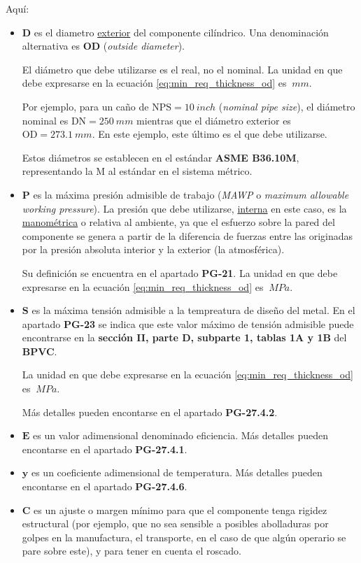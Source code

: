 Aquí:
\begin{itemize}
     \item $\mathbf{D}$ es el diametro \underline{exterior} del componente cilíndrico. Una denominación alternativa es $\mathbf{OD}$ (\textit{outside diameter}). 
     
     El diámetro que debe utilizarse es el real, no el nominal. La unidad en que debe expresarse en la ecuación \ref{eq:min_req_thickness_od} es $\SI{}{mm}$.
     
     Por ejemplo, para un caño de $\text{NPS}=\SI{10}{inch}$ (\textit{nominal pipe size}), el diámetro nominal es $\text{DN}=\SI{250}{mm}$ mientras que el diámetro exterior es $\text{OD}=\SI{273,1}{mm}$. En este ejemplo, este último es el que debe utilizarse.

     Estos diámetros se establecen en el estándar \textbf{ASME B36.10M}, representando la M al estándar en el sistema métrico.

     \item $\mathbf{P}$ es la máxima presión admisible de trabajo (\textit{MAWP} o \textit{maximum allowable working pressure}). La presión que debe utilizarse, \underline{interna} en este caso, es la \underline{manométrica} o relativa al ambiente, ya que el esfuerzo sobre la pared del componente se genera a partir de la diferencia de fuerzas entre las originadas por la presión absoluta interior y la exterior (la atmosférica).
     
     Su definición se encuentra en el apartado \textbf{PG-21}. La unidad en que debe expresarse en la ecuación \ref{eq:min_req_thickness_od} es $\SI{}{MPa}$.   

     \item $\mathbf{S}$ es la máxima tensión admisible a la tempreatura de diseño del metal. En el apartado \textbf{PG-23} se indica que este valor máximo de tensión admisible puede encontrarse en la \textbf{sección II, parte D, subparte 1, tablas 1A y 1B} del \textbf{BPVC}.
     
     La unidad en que debe expresarse en la ecuación \ref{eq:min_req_thickness_od} es $\SI{}{MPa}$.

     Más detalles pueden encontarse en el apartado \textbf{PG-27.4.2}.

     \item $\mathbf{E}$ es un valor adimensional denominado eficiencia. Más detalles pueden encontarse en el apartado \textbf{PG-27.4.1}.
     \item $\mathbf{y}$ es un coeficiente adimensional de temperatura. Más detalles pueden encontarse en el apartado \textbf{PG-27.4.6}.
     \item $\mathbf{C}$ es un ajuste o margen mínimo para que el componente tenga rigidez estructural (por ejemplo, que no sea sensible a posibles abolladuras por golpes en la manufactura, el transporte, en el caso de que algún operario se pare sobre este), y para tener en cuenta el roscado.
     

\end{itemize}
